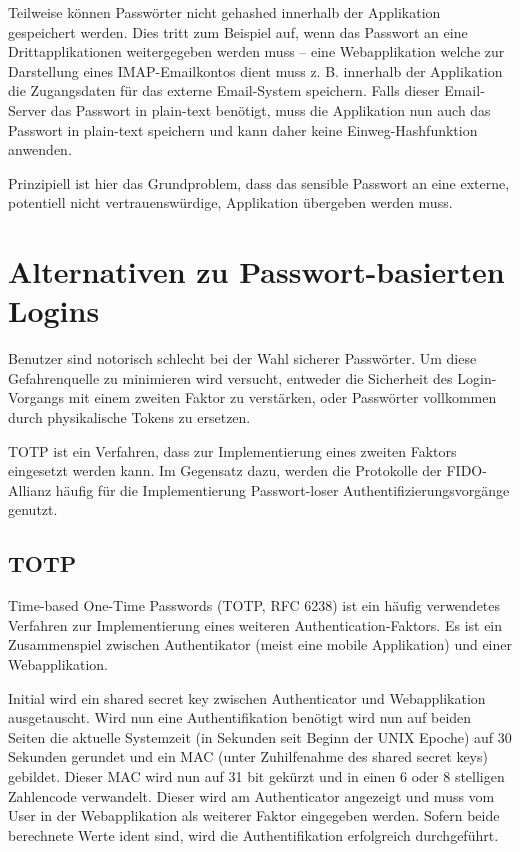 Teilweise können Passwörter nicht gehashed innerhalb der Applikation gespeichert werden. Dies tritt zum Beispiel auf, wenn das Passwort an eine Drittapplikationen weitergegeben werden muss -- eine Webapplikation welche zur Darstellung eines IMAP-Emailkontos dient muss z. B. innerhalb der Applikation die Zugangsdaten für das externe Email-System speichern. Falls dieser Email-Server das Passwort in plain-text benötigt, muss die Applikation nun auch das Passwort in plain-text speichern und kann daher keine Einweg-Hashfunktion anwenden.

Prinzipiell ist hier das Grundproblem, dass das sensible Passwort an eine externe, potentiell nicht vertrauenswürdige, Applikation übergeben werden muss.

\section{Alternativen zu Passwort-basierten Logins}

Benutzer sind notorisch schlecht bei der Wahl sicherer Passwörter. Um diese Gefahrenquelle zu minimieren wird versucht, entweder die Sicherheit des Login-Vorgangs mit einem zweiten Faktor zu verstärken, oder Passwörter vollkommen durch physikalische Tokens zu ersetzen.

TOTP ist ein Verfahren, dass zur Implementierung eines zweiten Faktors eingesetzt werden kann. Im Gegensatz dazu, werden die Protokolle der FIDO-Allianz häufig für die Implementierung Passwort-loser Authentifizierungsvorgänge genutzt.

\subsection{TOTP}

Time-based One-Time Passwords (TOTP, RFC 6238) ist ein häufig verwendetes Verfahren zur Implementierung eines weiteren Authentication-Faktors. Es ist ein Zusammenspiel zwischen Authentikator (meist eine mobile Applikation) und einer Webapplikation.

Initial wird ein shared secret key zwischen Authenticator und Webapplikation ausgetauscht. Wird nun eine Authentifikation benötigt wird nun auf beiden Seiten die aktuelle Systemzeit (in Sekunden seit Beginn der UNIX Epoche) auf 30 Sekunden gerundet und ein MAC (unter Zuhilfenahme des shared secret keys) gebildet. Dieser MAC wird nun auf 31 bit gekürzt und in einen 6 oder 8 stelligen Zahlencode verwandelt. Dieser wird am Authenticator angezeigt und muss vom User in der Webapplikation als weiterer Faktor eingegeben werden. Sofern beide berechnete Werte ident sind, wird die Authentifikation erfolgreich durchgeführt.

